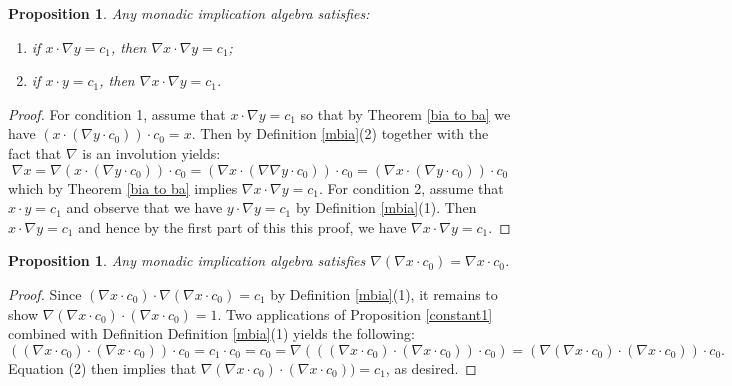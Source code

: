 \documentclass[reqno]{amsart}
\theoremstyle{plain}
\newtheorem{proposition}[theorem]{Proposition}
\theoremstyle{definition}
\begin{document}
\begin{proposition}\label{prop 3.8}
    Any monadic implication algebra satisfies: 
    \begin{enumerate}
        \item if $x\cdot\nabla y=c_1$, then $\nabla x\cdot\nabla y=c_1$; 
        \item if $x\cdot y=c_1$, then $\nabla x\cdot\nabla y=c_1$. 
    \end{enumerate}
\end{proposition}
\begin{proof}
    For condition 1, assume that $x\cdot\nabla y=c_1$ so that by Theorem \ref{bia to ba} we have $(x\cdot(\nabla y\cdot c_0))\cdot c_0=x$. Then by Definition \ref{mbia}(2) together with the fact that $\nabla$ is an involution yields: \[\nabla x=\nabla(x\cdot(\nabla y\cdot c_0))\cdot c_0=(\nabla x\cdot(\nabla\nabla y\cdot c_0))\cdot c_0=(\nabla x\cdot(\nabla y\cdot c_0))\cdot c_0\] which by Theorem \ref{bia to ba} implies $\nabla x\cdot\nabla y=c_1$. For condition 2, assume that $x\cdot y=c_1$ and observe that we have $y\cdot\nabla y=c_1$ by Definition \ref{mbia}(1). Then $x\cdot\nabla y=c_1$ and hence by the first part of this this proof, we have $\nabla x\cdot\nabla y=c_1$.    
\end{proof}
\begin{proposition}\label{prop 3.9}
    Any monadic implication algebra satisfies $\nabla(\nabla x\cdot c_0)=\nabla x\cdot c_0$. 
\end{proposition}
\begin{proof}
Since $(\nabla x\cdot c_0)\cdot\nabla(\nabla x\cdot c_0)=c_1$ by Definition \ref{mbia}(1), it remains to show $\nabla(\nabla x\cdot c_0)\cdot(\nabla x\cdot c_0)=1$. Two applications of Proposition \ref{constant1} combined with Definition Definition \ref{mbia}(1) yields the following:   
\begin{equation}
    ((\nabla x\cdot c_0)\cdot(\nabla x\cdot c_0))\cdot c_0=c_1\cdot c_0=c_0=\nabla(((\nabla x\cdot c_0)\cdot(\nabla x\cdot c_0))\cdot c_0)=(\nabla(\nabla x\cdot c_0)\cdot(\nabla x\cdot c_0))\cdot c_0.
\end{equation}
Equation (2) then implies that $\nabla(\nabla x\cdot c_0)\cdot(\nabla x\cdot c_0))=c_1$, as desired. 
\end{proof}
\end{document}
